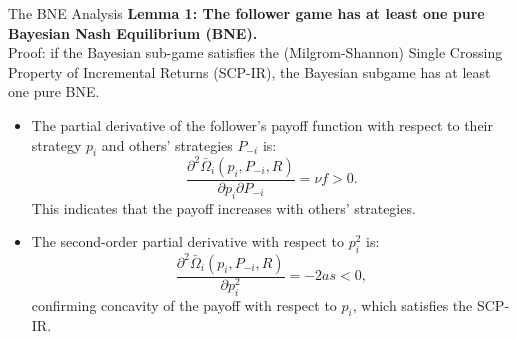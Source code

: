 \documentclass[aspectratio=169,xcolor=dvipsnames]{beamer}
\begin{document}
\begin{frame}[fragile]{The BNE Analysis}
    \footnotesize %
    \textbf{Lemma 1: The follower game has at least one pure Bayesian Nash Equilibrium (BNE).}\\
    \vspace{0.3cm}
    Proof: if the Bayesian sub-game satisfies the (Milgrom-Shannon) Single Crossing Property of Incremental Returns (SCP-IR), the Bayesian subgame has at least one pure BNE.\\
    \vspace{0.3cm}
    \begin{itemize}
        \item     The partial derivative of the follower's payoff function with respect to their strategy \( p_i \) and others' strategies \( P_{-i} \) is:
            \[
            \frac{\partial^2 \bar{\Omega}_i(p_i, P_{-i}, R)}{\partial p_i \partial P_{-i}} = \nu f > 0.
            \]    
    This indicates that the payoff increases with others' strategies.\\
        \item   The second-order partial derivative with respect to \( p_i^2 \) is:
                \[
                \frac{\partial^2 \bar{\Omega}_i(p_i, P_{-i}, R)}{\partial p_i^2} = -2as < 0,
                \]
                confirming concavity of the payoff with respect to \( p_i \), which satisfies the SCP-IR. \\
    \end{itemize}    
\end{frame}
\end{document}
